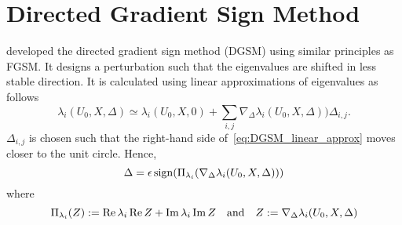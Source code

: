 \section{Directed Gradient Sign Method}
\cite{10383531} developed the directed gradient sign method (DGSM) using similar principles as FGSM. It designs a perturbation such that the eigenvalues are shifted in less stable direction. It is calculated using linear approximations of eigenvalues as follows
\begin{equation}\label{eq:DGSM_linear_approx}
 \lambda_i(U_0,X,\Delta)\simeq \lambda_i(U_0,X,0)+\sum_{i,j} \nabla_{\Delta}\lambda_i(U_0,X,\Delta)) \Delta_{i,j}.
\end{equation}
$\Delta_{i,j}$ is chosen such that the right-hand side of~\eqref{eq:DGSM_linear_approx} moves closer to the unit circle.
Hence, 
\[
 \Delta = \epsilon\, {\rm sign}(\Pi_{\lambda_i}(\nabla_{\Delta}\lambda_i(U_0,X,\Delta)))
\]
where 
\begin{equation}\label{eq:Pi}
 \Pi_{\lambda_i}(Z):= \Real{\lambda_i}\Real{Z}+\Imag{\lambda_i}\Imag{Z} \quad \text{and} \quad Z:=\nabla_{\Delta}\lambda_i(U_0,X,\Delta)
\end{equation}

